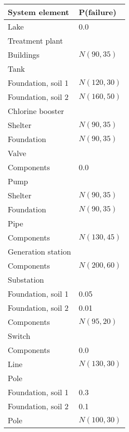 
\begin{table}
\centering
\begin{tabular}{l l}
\toprule
\bf{System element} & \bf{P(failure)}\\
\midrule
Lake&0.0\\
Treatment plant&\\
\hspace{10pt}Buildings&$N(90,35)$\\
Tank&\\
\hspace{10pt}Foundation, soil 1 & $N(120,30)$\\
\hspace{10pt}Foundation, soil 2 & $N(160,50)$\\
Chlorine booster&\\
\hspace{10pt}Shelter & $N(90,35)$\\
\hspace{10pt}Foundation & $N(90,35)$\\
Valve&\\
\hspace{10pt}Components & 0.0\\
Pump&\\
\hspace{10pt}Shelter & $N(90,35)$\\
\hspace{10pt}Foundation & $N(90,35)$\\
Pipe&\\
\hspace{10pt}Components & $N(130,45)$\\
Generation station&\\
\hspace{10pt}Components & $N(200,60)$\\
Substation&\\
\hspace{10pt}Foundation, soil 1 & 0.05\\
\hspace{10pt}Foundation, soil 2 & 0.01\\
\hspace{10pt}Components & $N(95,20)$\\
Switch&\\
\hspace{10pt}Components & 0.0\\
Line& $N(130,30)$\\
Pole&\\
\hspace{10pt}Foundation, soil 1 & 0.3\\
\hspace{10pt}Foundation, soil 2 & 0.1\\
\hspace{10pt}Pole & $N(100,30)$\\
\bottomrule
\end{tabular}


\end{table}
